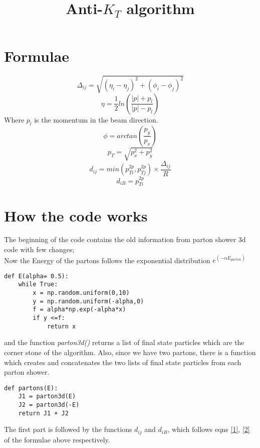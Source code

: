 \documentclass[10pt,a4paper]{article}
\title{Anti-$K_{T}$ algorithm}
\begin{document}
\maketitle
\section{Formulae}
\begin{equation}
\Delta_{ij} = \sqrt{(\eta_i - \eta_j)^2 + (\phi_i - \phi_j)^2} 
\end{equation}
\begin{equation}
\eta = \frac{1}{2} ln\left(\frac{|p| + p_l}{|p|-p_l}\right)
\end{equation}
Where $p_l$ is the momentum in the beam direction.
\begin{equation}
\phi = arctan\left(\frac{p_y}{p_x}\right)
\end{equation}
\begin{equation}
p_T = \sqrt{p_x^2 + p_y^2}
\end{equation}
\begin{equation}\label{1}
d_{ij} = min\left(p_{Ti}^{2p},p_{Tj}^{2p}\right)\times \frac{\Delta_{ij}}{R}
\end{equation}
\begin{equation}\label{2}
d_{iB} = p^{2p}_{Ti}
\end{equation}
\section{How the code works}
The beginning of the code contains the old information from parton shower 3d code with few changes; \\
Now the Energy of the partons follows the exponential distribution $e^{(-\alpha E_{parton})}$
\begin{verbatim}
def E(alpha= 0.5):
    while True:
        x = np.random.uniform(0,10)
        y = np.random.uniform(-alpha,0)
        f = alpha*np.exp(-alpha*x)
        if y <=f:
            return x
\end{verbatim} and the function \textit{parton3d()} returns a list of final state particles which are the corner stone of the algorithm. Also, since we have two partons, there is a function which creates and concatenates the two lists of final state particles from each parton shower.
\begin{verbatim}
def partons(E):
    J1 = parton3d(E)
    J2 = parton3d(-E)
    return J1 + J2
\end{verbatim}
The first part is followed by the functions $d_{ij}$ and $d_{iB}$, which follows  eqns \ref{1}, \ref{2} of the formulae above respectively.  
\end{document}

